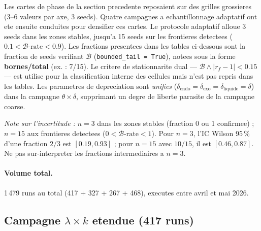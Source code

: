 \documentclass[11pt,a4paper]{article}
\begin{document}
Les cartes de phase de la section precedente reposaient sur des grilles grossieres
(3--6 valeurs par axe, 3 seeds). Quatre campagnes a echantillonnage adaptatif
ont ete ensuite conduites pour densifier ces cartes.
Le protocole adaptatif alloue 3 seeds dans les zones stables, jusqu'a 15 seeds
sur les frontieres detectees (\(0.1 < \mathcal{B}\text{-rate} < 0.9\)).
Les fractions presentees dans les tables ci-dessous sont la fraction de seeds
verifiant \(\mathcal{B}\) (\texttt{bounded\_tail = True}), notees sous
la forme \textbf{bornes/total} (ex. : 7/15). Le critere de stationnarite
dual --- \(\mathcal{B} \wedge |r_f - 1| < 0.15\) --- est utilise pour
la classification interne des cellules mais n'est pas repris dans les tables.
Les parametres de depreciation sont \emph{unifies} (\(\delta_{\mathrm{endo}} = \delta_{\mathrm{exo}} = \delta_{\mathrm{liquide}} = \delta\))
dans la campagne \(\theta \times \delta\), supprimant un degre de liberte
parasite de la campagne coarse.
\smallskip

\noindent\textit{Note sur l'incertitude :}
$n=3$ dans les zones stables (fraction 0 ou 1 confirmee) ;
$n=15$ aux frontieres detectees ($0 < \mathcal{B}\text{-rate} < 1$).
Pour $n=3$, l'IC Wilson 95\,\% d'une fraction $2/3$ est $[0.19, 0.93]$ ;
pour $n=15$ avec $10/15$, il est $[0.46, 0.87]$. Ne pas sur-interpreter
les fractions intermediaires a $n=3$.

\paragraph{Volume total.}
1\,479 runs au total (417 + 327 + 267 + 468), executes entre avril et mai 2026.

\subsection*{Campagne \(\lambda \times k\) etendue (417 runs)}
\end{document}
